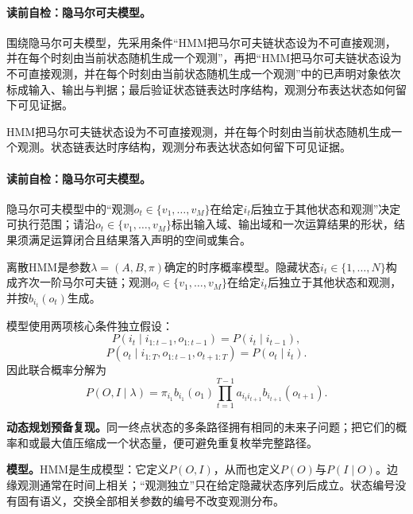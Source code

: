 \paragraph{读前自检：隐马尔可夫模型。}围绕隐马尔可夫模型，先采用条件“HMM把马尔可夫链状态设为不可直接观测，并在每个时刻由当前状态随机生成一个观测”，再把“HMM把马尔可夫链状态设为不可直接观测，并在每个时刻由当前状态随机生成一个观测”中的已声明对象依次标成输入、输出与判据；最后验证状态链表达时序结构，观测分布表达状态如何留下可见证据。\par

HMM把马尔可夫链状态设为不可直接观测，并在每个时刻由当前状态随机生成一个观测。状态链表达时序结构，观测分布表达状态如何留下可见证据。

\paragraph{读前自检：隐马尔可夫模型。}隐马尔可夫模型中的“观测$o_t\in\{v_1,\ldots,v_M\}$在给定$i_t$后独立于其他状态和观测”决定可执行范围；请沿$o_t\in\{v_1,\ldots,v_M\}$标出输入域、输出域和一次运算结果的形状，结果须满足运算闭合且结果落入声明的空间或集合。\par

\label{struct:V3-C05-CH07}
\begin{definition}[隐马尔可夫模型]\label{def:V3-C05-hmm}
离散HMM是参数$\lambda=(A,B,\pi)$确定的时序概率模型。隐藏状态$i_t\in\{1,\ldots,N\}$构成齐次一阶马尔可夫链；观测$o_t\in\{v_1,\ldots,v_M\}$在给定$i_t$后独立于其他状态和观测，并按$b_{i_t}(o_t)$生成。
\end{definition}

模型使用两项核心条件独立假设：
\[
P(i_t\mid i_{1:t-1},o_{1:t-1})=P(i_t\mid i_{t-1}),
\]
\[
P(o_t\mid i_{1:T},o_{1:t-1},o_{t+1:T})=P(o_t\mid i_t).
\]
因此联合概率分解为
\[
P(O,I\mid\lambda)=\pi_{i_1}b_{i_1}(o_1)
\prod_{t=1}^{T-1}a_{i_ti_{t+1}}b_{i_{t+1}}(o_{t+1}).
\]

\label{replay:V3-C05-S01-PRE-SQ-008}
\textbf{动态规划预备复现。}同一终点状态的多条路径拥有相同的未来子问题；把它们的概率和或最大值压缩成一个状态量，便可避免重复枚举完整路径。

\label{struct:V3-C05-CH08}
\textbf{模型。}HMM是生成模型：它定义$P(O,I)$，从而也定义$P(O)$与$P(I\mid O)$。边缘观测通常在时间上相关；“观测独立”只在给定隐藏状态序列后成立。状态编号没有固有语义，交换全部相关参数的编号不改变观测分布。

